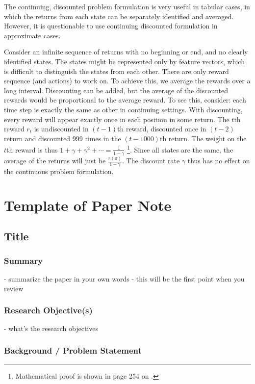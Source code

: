 \documentclass[lang=en,mode=normal,device=normal,color=blue,12pt]{elegantnote}
\DeclareMathOperator*{\1}{\mathbbm{1}}
\begin{document}
\begin{appendices}
The continuing, discounted problem formulation is very useful in tabular cases, in which the returns from each state can be separately identified and averaged. However, it is questionable to use continuing discounted formulation in approximate cases.

Consider an infinite sequence of returns with no beginning or end, and no clearly identified states. The states might be represented only by feature vectors, which is difficult to distinguish the states from each other. There are only reward sequence (and actions) to work on. To achieve this, we average the rewards over a long interval. Discounting can be added, but the average of the discounted rewards would be proportional to the average reward. To see this, consider:
each time step is exactly the same as other in continuing settings. With discounting, every reward will appear exactly once in each position in some return. The $t$th reward $r_t$ is undiscounted in $(t-1)$th reward, discounted once in $(t-2)$ return and discounted 999 times in the $(t-1000)$th return. The weight on the $t$th reward is thus $1+\gamma + \gamma^2 + \cdots = \frac{1}{1-\gamma}$ \footnote{Mathematical proof is shown in page 254 on \cite{Sutton1998}.}.
Since all states are the same, the average of the returns will just be $\frac{r(\pi)}{1-\gamma}$.
The discount rate $\gamma$ thus has no effect on the continuous problem formulation.


\newpage
\section{Template of Paper Note}

\subsection{Title}
\subsubsection{Summary}

- summarize the paper in your own words
- this will be the first point when you review

\subsubsection{Research Objective(s)}

- what's the research objectives

\subsubsection{Background / Problem Statement}


\end{appendices}
\end{document}
